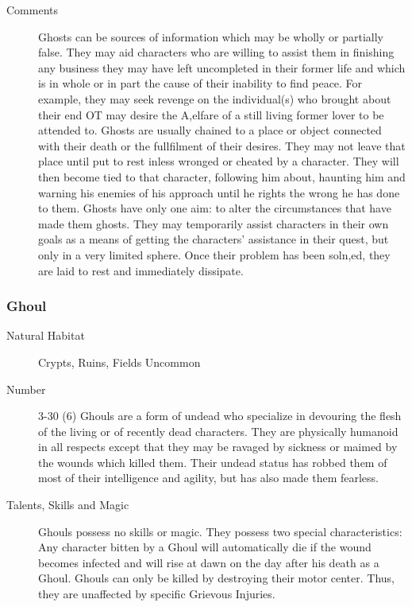 \begin{multicols}{2}
\begin{description}
\item[Comments] Ghosts can be sources of information which may be wholly or
partially false. They may aid characters who are willing to assist
them in finishing any business they may have left uncompleted in their
former life and which is in whole or in part the cause of their
inability to find peace. For example, they may seek revenge on the
individual(s) who brought about their end OT may desire the A,elfare
of a still living former lover to be attended to. Ghosts are usually
chained to a place or object connected with their death or the
fullfilment of their desires.  They may not leave that place until put
to rest inless wronged or cheated by a character. They will then
become tied to that character, following him about, haunting him and
warning his enemies of his approach until he rights the wrong he has
done to them. Ghosts have only one aim: to alter the circumstances
that have made them ghosts. They may temporarily assist characters in
their own goals as a means of getting the characters' assistance in
their quest, but only in a very limited sphere. Once their problem has
been soln,ed, they are laid to rest and immediately dissipate.

\end{description}

\subsubsection{Ghoul}

\begin{description}
\item[Natural Habitat] Crypts, Ruins, Fields Uncommon

\item[Number]   3-30 (6)
 Ghouls are a form of undead who specialize in devouring
the flesh of the living or of recently dead characters.  They are
physically humanoid in all respects except that they may be ravaged by
sickness or maimed by the wounds which killed them. Their undead
status has robbed them of most of their intelligence and agility, but
has also made them fearless.

\item[Talents, Skills and Magic] Ghouls possess no skills or magic.  They possess two special
characteristics: Any character bitten by a Ghoul will automatically
die if the wound becomes infected and will rise at dawn on the day
after his death as a Ghoul.  Ghouls can only be killed by destroying
their motor center.  Thus, they are unaffected by specific Grievous
Injuries.


\end{description}
\end{multicols}
